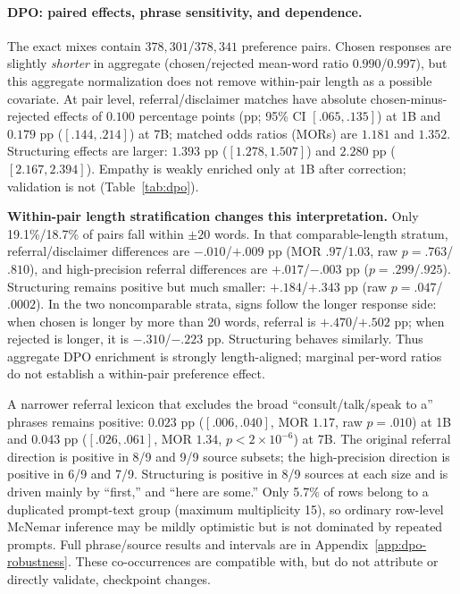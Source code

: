 \documentclass[11pt]{article}
\begin{document}
\paragraph{DPO: paired effects, phrase sensitivity, and dependence.}
The exact mixes contain $378{,}301$/$378{,}341$ preference pairs. Chosen
responses are slightly \emph{shorter} in aggregate (chosen/rejected mean-word
ratio $0.990$/$0.997$), but this aggregate normalization does not remove
within-pair length as a possible covariate. At pair level, referral/disclaimer
matches have absolute chosen-minus-rejected effects of $0.100$ percentage
points (pp; 95\% CI $[.065,.135]$) at 1B and $0.179$ pp
($[.144,.214]$) at 7B; matched odds ratios (MORs) are $1.181$ and $1.352$.
Structuring effects are larger: $1.393$ pp ($[1.278,1.507]$) and $2.280$ pp
($[2.167,2.394]$). Empathy is weakly enriched only at 1B after correction;
validation is not (Table~\ref{tab:dpo}).

\textbf{Within-pair length stratification changes this interpretation.} Only
19.1\%/18.7\% of pairs fall within $\pm20$ words. In that comparable-length
stratum, referral/disclaimer differences are $-.010$/$+.009$ pp (MOR
$.97$/$1.03$, raw $p=.763$/$.810$), and high-precision referral differences
are $+.017$/$-.003$ pp ($p=.299$/$.925$). Structuring remains positive but much
smaller: $+.184$/$+.343$ pp (raw $p=.047$/$.0002$). In the two noncomparable
strata, signs follow the longer response side: when chosen is longer by more
than 20 words, referral is $+.470$/$+.502$ pp; when rejected is longer, it is
$-.310$/$-.223$ pp. Structuring behaves similarly. Thus aggregate DPO
enrichment is strongly length-aligned; marginal per-word ratios do not establish
a within-pair preference effect.

A narrower referral lexicon that excludes the broad ``consult/talk/speak to a''
phrases remains positive: $0.023$ pp ($[.006,.040]$, MOR $1.17$, raw
$p=.010$) at 1B and $0.043$ pp ($[.026,.061]$, MOR $1.34$,
$p<2\times10^{-6}$) at 7B. The original referral direction is positive in
8/9 and 9/9 source subsets; the high-precision direction is positive in 6/9
and 7/9. Structuring is positive in 8/9 sources at each size and is driven
mainly by ``first,'' and ``here are some.'' Only 5.7\% of rows belong to a
duplicated prompt-text group (maximum multiplicity 15), so ordinary row-level
McNemar inference may be mildly optimistic but is not dominated by repeated
prompts. Full phrase/source results and intervals are in
Appendix~\ref{app:dpo-robustness}. These co-occurrences are compatible with,
but do not attribute or directly validate, checkpoint changes.
\end{document}
